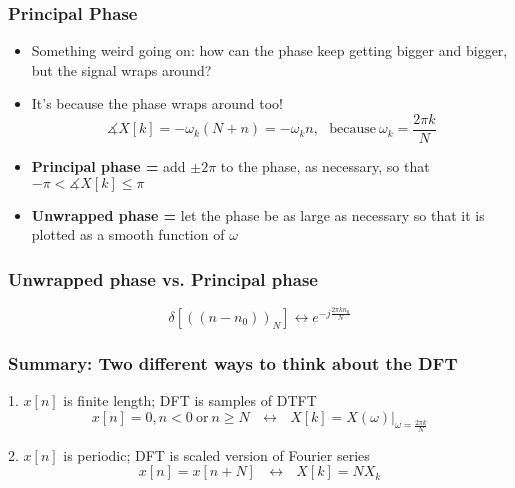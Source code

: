 \documentclass{beamer}
\begin{document}
\begin{frame}
  \frametitle{Principal Phase}

  \begin{itemize}
  \item Something weird going on: how can the phase keep getting
    bigger and bigger, but the signal wraps around?
  \item It's because the phase wraps around too!
    \begin{displaymath}
      \measuredangle X[k] = -\omega_k (N+n) = -\omega_k n,~~~\mbox{because}~\omega_k=\frac{2\pi k}{N}
    \end{displaymath}
  \item {\bf Principal phase =} add $\pm 2\pi$ to the phase, as
    necessary, so that $-\pi< \measuredangle X[k]\le \pi$
  \item {\bf Unwrapped phase = } let the phase be as large as
    necessary so that it is plotted as a smooth function of $\omega$
  \end{itemize}
\end{frame}

\begin{frame}
  \frametitle{Unwrapped phase vs. Principal phase}

  \begin{displaymath}
    \delta\left[(\!(n-n_0)\!)_N\right] \leftrightarrow e^{-j\frac{2\pi kn_0}{N}}
  \end{displaymath}
  
  \centerline{}

\end{frame}

\begin{frame}
  \frametitle{Summary: Two different ways to think about the DFT}
  \begin{block}{1. $x[n]$ is finite length; DFT is samples of DTFT}
    \begin{displaymath}
      x[n]=0,n<0~\text{or}~n\ge N~~~\leftrightarrow~~~X[k]=\left.X(\omega)\right|_{\omega=\frac{2\pi k}{N}}
    \end{displaymath}
  \end{block}
  \begin{block}{2. $x[n]$ is periodic; DFT is scaled version of Fourier series}
    \begin{displaymath}
      x[n]=x[n+N]~~~\leftrightarrow~~~X[k]=N X_k
    \end{displaymath}
  \end{block}
\end{frame}
\end{document}
